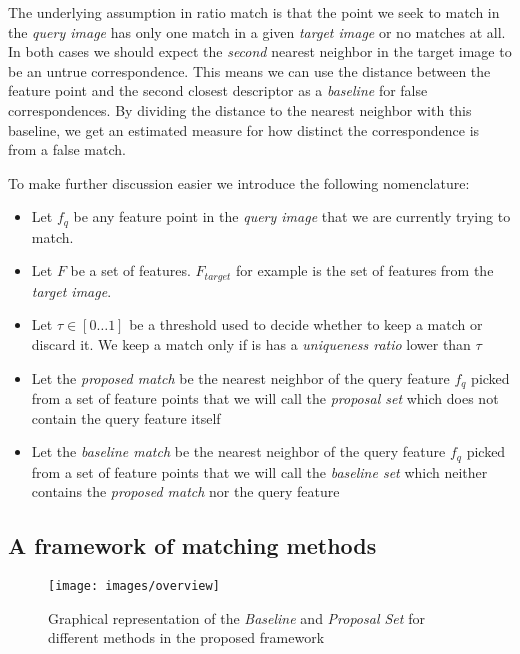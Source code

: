 \documentclass[10pt,journal,cspaper,compsoc]{IEEEtran}
\begin{document}
The underlying assumption in ratio match is that the point we seek to 
match in the \emph{query image} has only one match in a given 
\emph{target image} or no matches at all. In both cases we should expect 
the \emph{second} nearest neighbor in the target image to be an 
untrue correspondence.  This means we can use the distance between the 
feature point and the second closest descriptor as a \emph{baseline} for 
false correspondences. By dividing the distance to the nearest neighbor 
with this baseline, we get an estimated measure for how distinct the 
correspondence is from a false match.  

To make further discussion easier we introduce the following 
nomenclature:
\begin{itemize}
\item{Let $f_q$ be any feature point in the \emph{query image} that we 
    are currently trying to match}.
\item{Let $F$ be a set of features. $F_{target}$ for example is the set 
    of features from the \emph{target image}}.
\item{Let $\tau \in [0 \ldots 1]$ be a threshold used to decide whether 
    to keep a match or discard it. We keep a match only if is has a 
\emph{uniqueness ratio} lower than $\tau$}
\item{Let the \emph{proposed match} be the nearest neighbor of the query 
    feature $f_q$ picked from a set of feature points that we will call 
the \emph{proposal set} which does not contain the query feature itself}
\item{Let the \emph{baseline match} be the nearest neighbor of the query 
    feature $f_q$ picked from a set of feature points that we will call 
the \emph{baseline set} which neither contains the \emph{proposed match} 
nor the query feature}
\end{itemize}

%
\subsection{A framework of matching methods}
%

\begin{figure}[t]
\centering
\texttt{[image: images/overview]}
\caption{Graphical representation of the \emph{Baseline} and 
\emph{Proposal Set} for different methods in the proposed framework}
\label{fig:overview}
\end{figure}
\end{document}
